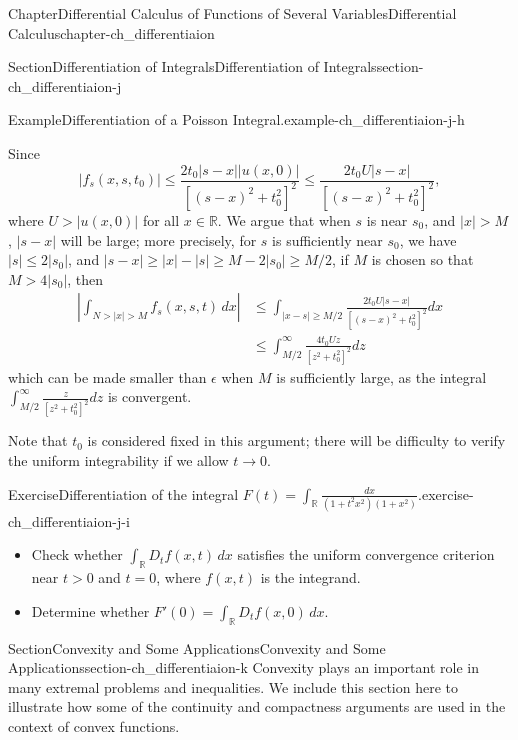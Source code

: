 \documentclass[oneside,10pt,]{book}
\numberwithin{equation}{section}
\newcommand{\amp}{&}
\begin{document}
\begin{chapterptx}{Chapter}{Differential Calculus of Functions of Several Variables}{}{Differential Calculus}{}{}{chapter-ch_differentiaion}
\begin{sectionptx}{Section}{Differentiation of Integrals}{}{Differentiation of Integrals}{}{}{section-ch_differentiaion-j}
\begin{example}{Example}{Differentiation of a Poisson Integral.}{example-ch_differentiaion-j-h}
\par
Since%
\begin{equation*}
|f_s(x,s,t_0) | \le \frac{ 2 t_0 |s-x| |u(x,0)|}{[ (s-x)^2 +t_0^2]^2} \le \frac{ 2 t_0 U |s-x| }{[ (s-x)^2 +t_0^2]^2},
\end{equation*}
where \(U>| u(x,0)|\) for all \(x\in \mathbb R\). We argue that when \(s\) is near \(s_0\), and \(|x|>M\), \(|s-x|\) will be large; more precisely, for \(s\) is sufficiently near \(s_0\), we have \(|s|\le 2 |s_0|\), and \(|s-x| \ge |x| -|s| \ge M-2|s_0|\ge M/2\), if \(M\) is chosen so that \(M> 4|s_0|\),  then%
\begin{align*}
\left| \int_{N>|x|>M} f_s(x,s,t) \, dx \right| \amp \le 
\int_{|x-s| \ge M/2} \frac{ 2 t_0 U |s-x| }{[ (s-x)^2 +t_0^2]^2} dx \\
\amp \le \int_{M/2}^{\infty} \frac{4t_0U z }{[z^2 +t_0^2]^2} dz
\end{align*}
which can be made smaller than \(\epsilon\) when \(M\) is sufficiently large, as the integral \(\int_{M/2}^{\infty} \frac{z }{[z^2 +t_0^2]^2} dz\) is convergent.%
\par
Note that \(t_0\) is considered fixed in this argument; there will be difficulty to verify the uniform integrability if we allow \(t\to 0\).%
\end{example}
\begin{inlineexercise}{Exercise}{Differentiation of the integral \(F(t)=\int_{\mathbb R} \frac{dx}{(1+t^2x^2)(1+x^2)}\).}{exercise-ch_differentiaion-j-i}%
%
\begin{itemize}[label=\textbullet]
\item{}Check whether \(\int_{\mathbb R} D_t f(x,t)\, dx\) satisfies the uniform convergence criterion near \(t>0\) and \(t=0\), where \(f(x, t)\) is the integrand.%
\item{}Determine whether \(F'(0)=\int_{\mathbb R} D_t f(x,0)\, dx\).%
\end{itemize}
\end{inlineexercise}%
\end{sectionptx}
%
%
\typeout{************************************************}
\typeout{************************************************}
%
\begin{sectionptx}{Section}{Convexity and Some Applications}{}{Convexity and Some Applications}{}{}{section-ch_differentiaion-k}
Convexity plays an important role in many extremal problems and inequalities. We include this section here to illustrate how some of the continuity and compactness arguments are used in the context of convex functions.%

\end{sectionptx}
\end{chapterptx}
\end{document}

